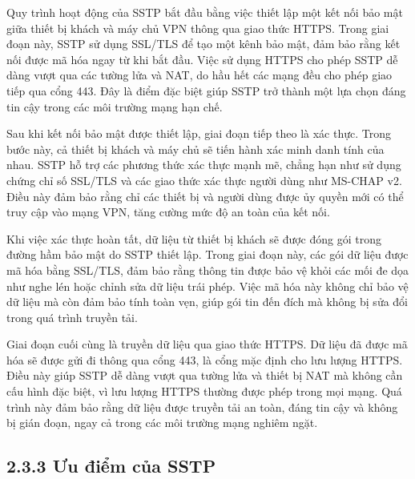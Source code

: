  Quy trình hoạt động của SSTP bắt đầu bằng việc thiết lập một kết nối bảo mật giữa thiết bị khách và máy chủ VPN thông qua giao thức HTTPS. Trong giai đoạn này, SSTP sử dụng SSL/TLS để tạo một kênh bảo mật, đảm bảo rằng kết nối được mã hóa ngay từ khi bắt đầu. Việc sử dụng HTTPS cho phép SSTP dễ dàng vượt qua các tường lửa và NAT, do hầu hết các mạng đều cho phép giao tiếp qua cổng 443. Đây là điểm đặc biệt giúp SSTP trở thành một lựa chọn đáng tin cậy trong các môi trường mạng hạn chế.

 Sau khi kết nối bảo mật được thiết lập, giai đoạn tiếp theo là xác thực. Trong bước này, cả thiết bị khách và máy chủ sẽ tiến hành xác minh danh tính của nhau. SSTP hỗ trợ các phương thức xác thực mạnh mẽ, chẳng hạn như sử dụng chứng chỉ số SSL/TLS và các giao thức xác thực người dùng như MS-CHAP v2. Điều này đảm bảo rằng chỉ các thiết bị và người dùng được ủy quyền mới có thể truy cập vào mạng VPN, tăng cường mức độ an toàn của kết nối.

 Khi việc xác thực hoàn tất, dữ liệu từ thiết bị khách sẽ được đóng gói trong đường hầm bảo mật do SSTP thiết lập. Trong giai đoạn này, các gói dữ liệu được mã hóa bằng SSL/TLS, đảm bảo rằng thông tin được bảo vệ khỏi các mối đe dọa như nghe lén hoặc chỉnh sửa dữ liệu trái phép. Việc mã hóa này không chỉ bảo vệ dữ liệu mà còn đảm bảo tính toàn vẹn, giúp gói tin đến đích mà không bị sửa đổi trong quá trình truyền tải.

 Giai đoạn cuối cùng là truyền dữ liệu qua giao thức HTTPS. Dữ liệu đã được mã hóa sẽ được gửi đi thông qua cổng 443, là cổng mặc định cho lưu lượng HTTPS. Điều này giúp SSTP dễ dàng vượt qua tường lửa và thiết bị NAT mà không cần cấu hình đặc biệt, vì lưu lượng HTTPS thường được phép trong mọi mạng. Quá trình này đảm bảo rằng dữ liệu được truyền tải an toàn, đáng tin cậy và không bị gián đoạn, ngay cả trong các môi trường mạng nghiêm ngặt.
 \subsection*{2.3.3 Ưu điểm của SSTP}

